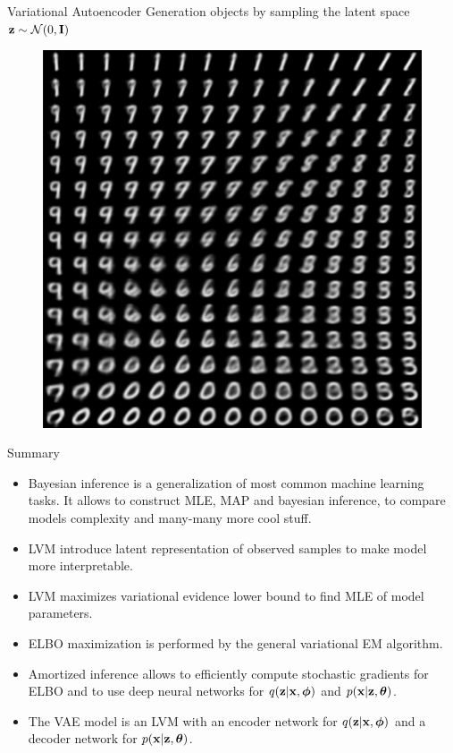 \begin{frame}{Variational Autoencoder}
Generation objects by sampling the latent space $\mathbf{z} \sim \mathcal{N}(0, \mathbf{I})$
\begin{figure}[h]
	\centering
	\includegraphics[width=.5\linewidth]{figs/vae_0.png}
\end{figure}
\end{frame}
\begin{frame}{Summary}
	\begin{itemize}
		\item Bayesian inference is a generalization of most common machine learning tasks. It allows to construct MLE, MAP and bayesian inference, to compare models complexity and many-many more cool stuff.
		\item LVM introduce latent representation of observed samples to make model more interpretable.
		\item LVM maximizes variational evidence lower bound to find MLE of model parameters.
		\item ELBO maximization is performed by the general variational EM algorithm.
		\item Amortized inference allows to efficiently compute stochastic gradients for ELBO and to use deep neural networks for $q(\mathbf{z} | \mathbf{x}, \boldsymbol{\phi})$ and $p(\mathbf{x} | \mathbf{z}, \boldsymbol{\theta})$.
		\item The VAE model is an LVM with an encoder network for $q(\mathbf{z} | \mathbf{x}, \boldsymbol{\phi})$ and a decoder network for $p(\mathbf{x} | \mathbf{z}, \boldsymbol{\theta})$.
	\end{itemize}
\end{frame}
 